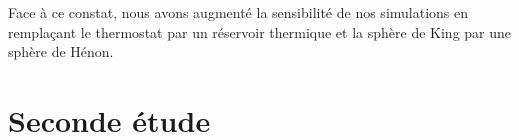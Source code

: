 


	Face à ce constat, nous avons augmenté la sensibilité de nos simulations en remplaçant le thermostat par un réservoir thermique et la
	sphère de King par une sphère de Hénon.



\section{Seconde étude}



